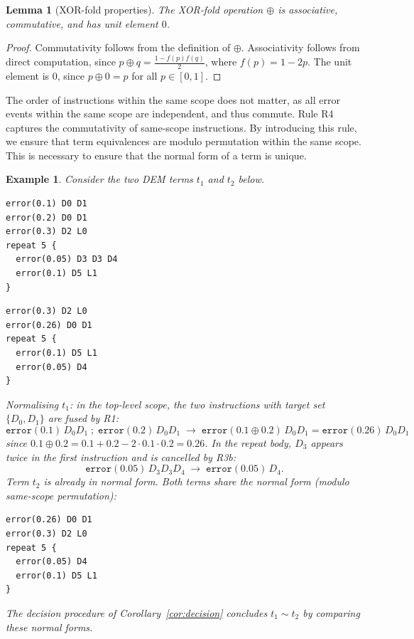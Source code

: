 \documentclass[11pt,a4paper]{article}
\newtheorem{lemma}[theorem]{Lemma}
\newtheorem{example}[theorem]{Example}
\newcommand{\nf}[1]{\mathrm{nf}(#1)}  %
\newcommand{\xorfold}{\oplus}          %
\newcommand{\tostep}{\to}
\begin{document}
\begin{lemma}[XOR-fold properties]
\label{lem:xorfold}
The XOR-fold operation $\xorfold$ is associative, commutative, and has unit element $0$.
\end{lemma}

\begin{proof}
Commutativity follows from the definition of $\xorfold$. Associativity follows from direct computation, since $p \xorfold q = \frac{1-f(p)f(q)}{2}$, where $f(p) = 1 - 2p$. The unit element is $0$, since $p \xorfold 0 = p$ for all $p \in [0,1]$.  
\end{proof}

The order of instructions within the same scope does not matter, as all error events within the same scope are independent, and thus commute. Rule R4 captures the commutativity of same-scope instructions. By introducing this rule, we ensure that term equivalences are modulo permutation within the same scope. This is necessary to ensure that the normal form of a term is unique.

\begin{example}
\label{ex:normalform}
Consider the two DEM terms $t_1$ and $t_2$ below.

\noindent
\begin{minipage}[t]{0.48\linewidth}
\begin{lstlisting}[caption={Term $t_1$}]
error(0.1) D0 D1
error(0.2) D0 D1
error(0.3) D2 L0
repeat 5 {
  error(0.05) D3 D3 D4
  error(0.1) D5 L1
}
\end{lstlisting}
\end{minipage}
\hfill
\begin{minipage}[t]{0.48\linewidth}
\begin{lstlisting}[caption={Term $t_2$}]
error(0.3) D2 L0
error(0.26) D0 D1
repeat 5 {
  error(0.1) D5 L1
  error(0.05) D4
}
\end{lstlisting}
\end{minipage}

\smallskip
\noindent Normalising $t_1$: in the top-level scope, the two instructions with target set $\{D_0, D_1\}$ are fused by R1:
\[
  \mathtt{error}(0.1)\,D_0 D_1 \;;\; \mathtt{error}(0.2)\,D_0 D_1
  \;\tostep\;
  \mathtt{error}(0.1 \xorfold 0.2)\,D_0 D_1
  = \mathtt{error}(0.26)\,D_0 D_1
\]
since $0.1 \xorfold 0.2 = 0.1 + 0.2 - 2 \cdot 0.1 \cdot 0.2 = 0.26$.
In the repeat body, $D_3$ appears twice in the first instruction and is cancelled by R3b:
\[
  \mathtt{error}(0.05)\,D_3 D_3 D_4 \;\tostep\; \mathtt{error}(0.05)\,D_4.
\]
Term $t_2$ is already in normal form. Both terms share the normal form (modulo same-scope permutation):
\begin{lstlisting}[caption={Common normal form $\nf{t_1} = \nf{t_2}$}]
error(0.26) D0 D1
error(0.3) D2 L0
repeat 5 {
  error(0.05) D4
  error(0.1) D5 L1
}
\end{lstlisting}
The decision procedure of Corollary~\ref{cor:decision} concludes $t_1 \sim t_2$ by comparing these normal forms.
\end{example}
\end{document}
